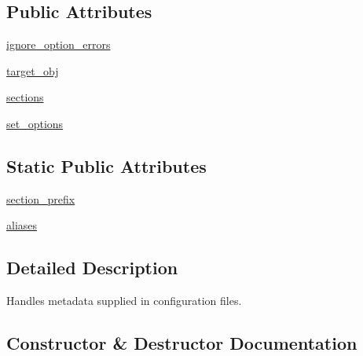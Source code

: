\subsection*{Public Attributes}
\begin{DoxyCompactItemize}
\item 
\hyperlink{classsetuptools_1_1config_1_1ConfigHandler_a5d64dedea13caaf606cde29c6aac8d97}{ignore\+\_\+option\+\_\+errors}
\item 
\hyperlink{classsetuptools_1_1config_1_1ConfigHandler_aa932a185c0e0fd1d98ebc8bceb88b153}{target\+\_\+obj}
\item 
\hyperlink{classsetuptools_1_1config_1_1ConfigHandler_a46419994f67045997eeb6dfd75da23d1}{sections}
\item 
\hyperlink{classsetuptools_1_1config_1_1ConfigHandler_a670721835f76b2148ef5f8b05e51d8f1}{set\+\_\+options}
\end{DoxyCompactItemize}
\subsection*{Static Public Attributes}
\begin{DoxyCompactItemize}
\item 
\hyperlink{classsetuptools_1_1config_1_1ConfigHandler_a4d832c71e7372fa90bc76a5827de5ed2}{section\+\_\+prefix}
\item 
\hyperlink{classsetuptools_1_1config_1_1ConfigHandler_a7692b812de7bbc4541531b169036064f}{aliases}
\end{DoxyCompactItemize}


\subsection{Detailed Description}
\begin{DoxyVerb}Handles metadata supplied in configuration files.\end{DoxyVerb}
 

\subsection{Constructor \& Destructor Documentation}
\mbox{\label{classsetuptools_1_1config_1_1ConfigHandler_a00d3fc6e1c42f5e46490a423b4d124b6}} 
